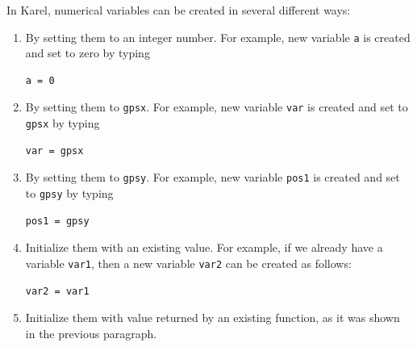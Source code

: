 \documentclass[article,A4,12pt]{llncs}
\begin{document}
In Karel, numerical variables can be created in several different ways: 
\begin{enumerate}
\item By setting them to an integer number. For example, new variable {\tt a} is created and set to zero by typing \\

\begin{bboxshort}
\begin{Verbatim}[commandchars=\\\{\}]
a = 0
\end{Verbatim}
\end{bboxshort}
\vspace{1mm}

\noindent
\item By setting them to {\tt gpsx}. For example, new variable {\tt var} is created and set to {\tt gpsx} by typing\\

\begin{bboxshort}
\begin{Verbatim}[commandchars=\\\{\}]
var = gpsx
\end{Verbatim}
\end{bboxshort}
\vspace{1mm}

\noindent
\item By setting them to {\tt gpsy}. For example, new variable {\tt pos1} is created and set to {\tt gpsy} by typing\\

\begin{bboxshort}
\begin{Verbatim}[commandchars=\\\{\}]
pos1 = gpsy
\end{Verbatim}
\end{bboxshort}
\vspace{1mm}

\noindent
\item Initialize them with an existing value. For example, if we already have a variable {\tt var1}, then a new variable 
{\tt var2} can be created as follows:\\

\begin{bboxshort}
\begin{Verbatim}[commandchars=\\\{\}]
var2 = var1
\end{Verbatim}
\end{bboxshort}
\vspace{1mm}

\noindent
\item Initialize them with value returned by an existing function, as it was shown in the previous 
paragraph. 
\end{enumerate}
\end{document}

